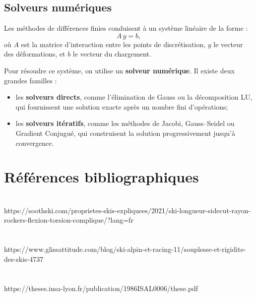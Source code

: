 \documentclass[12pt, a4paper]{article}
\begin{document}
\subsection{Solveurs numériques}

Les méthodes de différences finies conduisent à un système linéaire de la forme :
\[
A \, y = b,
\]
où $A$ est la matrice d'interaction entre les points de discrétisation, $y$ le vecteur des déformations, et $b$ le vecteur du chargement.

Pour résoudre ce système, on utilise un \textbf{solveur numérique}. Il existe deux grandes familles :
\begin{itemize}
\item les \textbf{solveurs directs}, comme l’élimination de Gauss ou la décomposition LU, qui fournissent une solution exacte après un nombre fini d’opérations;
  \item les \textbf{solveurs itératifs}, comme les méthodes de Jacobi, Gauss–Seidel ou Gradient Conjugué, qui construisent la solution progressivement jusqu’à convergence.
\end{itemize}

\section{\textbf{Références bibliographiques}}
\noindent
\\
https://soothski.com/proprietes-skis-expliquees/2021/ski-longueur-sidecut-rayon-rockers-flexion-torsion-complique/?lang=fr \\\\\\
https://www.glissattitude.com/blog/ski-alpin-et-racing-11/souplesse-et-rigidite-des-skis-4737 \\\\\\
https://theses.insa-lyon.fr/publication/1986ISAL0006/these.pdf
\end{document}
